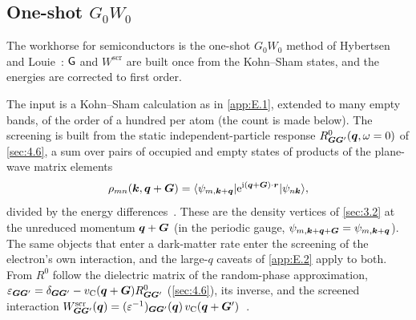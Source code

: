 \subsection{One-shot \texorpdfstring{$G_0W_0$}{G0W0}}

The workhorse for semiconductors is the one-shot $G_0W_0$ method of Hybertsen and Louie~\cite{hybertsen1986electron}: $\mathsf{G}$ and $W^{\mathrm{scr}}$ are built once from the Kohn--Sham states, and the energies are corrected to first order.

The input is a Kohn--Sham calculation as in \cref{app:E.1}, extended to many empty bands, of the order of a hundred per atom (the count is made below). The screening is built from the static independent-particle response $R^0_{\bm{G}\bm{G}'}(\bm{q}, \omega = 0)$ of \cref{sec:4.6}, a sum over pairs of occupied and empty states of products of the plane-wave matrix elements
\begin{equation}
  \rho_{mn}(\bm{k}, \bm{q} + \bm{G}) = \langle\psi_{m,\bm{k}+\bm{q}}|\mathrm{e}^{\mathrm{i}(\bm{q}+\bm{G})\cdot\bm{r}}|\psi_{n\bm{k}}\rangle ,
  \label{eq:E.3-M}
\end{equation}
divided by the energy differences~\cite[Eqs.~(7) and (8)]{deslippe2012berkeleygw}. These are the density vertices of \cref{sec:3.2} at the unreduced momentum $\bm{q} + \bm{G}$ (in the periodic gauge, $\psi_{m,\bm{k}+\bm{q}+\bm{G}} = \psi_{m,\bm{k}+\bm{q}}$). The same objects that enter a dark-matter rate enter the screening of the electron's own interaction, and the large-$q$ caveats of \cref{app:E.2} apply to both. From $R^0$ follow the dielectric matrix of the random-phase approximation, $\varepsilon_{\bm{G}\bm{G}'} = \delta_{\bm{G}\bm{G}'} - v_{\mathrm{C}}(\bm{q} + \bm{G})R^0_{\bm{G}\bm{G}'}$ (\cref{sec:4.6}), its inverse, and the screened interaction $W^{\mathrm{scr}}_{\bm{G}\bm{G}'}(\bm{q}) = (\varepsilon^{-1})_{\bm{G}\bm{G}'}(\bm{q})\,v_{\mathrm{C}}(\bm{q} + \bm{G}')$~\cite[Eq.~(12)]{deslippe2012berkeleygw}.

